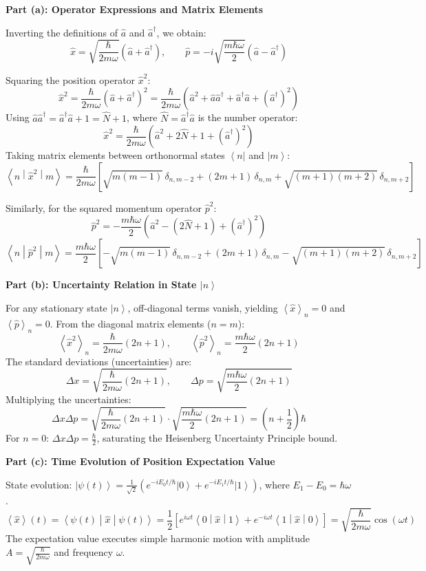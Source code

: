 \documentclass[11pt, a4paper, parskip=half]{scrartcl}
\newcommand{\ket}[1]{\left| #1 \right\rangle}
\newcommand{\bra}[1]{\left\langle #1 \right|}
\newcommand{\mel}[3]{\left\langle #1 \middle| #2 \middle| #3 \right\rangle}
\newcommand{\expval}[1]{\left\langle #1 \right\rangle}
\begin{document}
\begin{solutionbox}
\textbf{Part (a): Operator Expressions and Matrix Elements}

Inverting the definitions of $\hat{a}$ and $\hat{a}^\dagger$, we obtain:
\[
\hat{x} = \sqrt{\frac{\hbar}{2m\omega}} \left( \hat{a} + \hat{a}^\dagger \right), \qquad
\hat{p} = -i \sqrt{\frac{m\hbar\omega}{2}} \left( \hat{a} - \hat{a}^\dagger \right)
\]

Squaring the position operator $\hat{x}^2$:
\[
\hat{x}^2 = \frac{\hbar}{2m\omega} \left( \hat{a} + \hat{a}^\dagger \right)^2 = \frac{\hbar}{2m\omega} \left( \hat{a}^2 + \hat{a}\hat{a}^\dagger + \hat{a}^\dagger\hat{a} + (\hat{a}^\dagger)^2 \right)
\]
Using $\hat{a}\hat{a}^\dagger = \hat{a}^\dagger\hat{a} + 1 = \hat{N} + 1$, where $\hat{N} = \hat{a}^\dagger\hat{a}$ is the number operator:
\[
\hat{x}^2 = \frac{\hbar}{2m\omega} \left( \hat{a}^2 + 2\hat{N} + 1 + (\hat{a}^\dagger)^2 \right)
\]
Taking matrix elements between orthonormal states $\bra{n}$ and $\ket{m}$:
\[
\mel{n}{\hat{x}^2}{m} = \frac{\hbar}{2m\omega} \left[ \sqrt{m(m-1)}\,\delta_{n, m-2} + (2m+1)\,\delta_{n,m} + \sqrt{(m+1)(m+2)}\,\delta_{n, m+2} \right]
\]

Similarly, for the squared momentum operator $\hat{p}^2$:
\[
\hat{p}^2 = -\frac{m\hbar\omega}{2} \left( \hat{a}^2 - (2\hat{N} + 1) + (\hat{a}^\dagger)^2 \right)
\]
\[
\mel{n}{\hat{p}^2}{m} = \frac{m\hbar\omega}{2} \left[ -\sqrt{m(m-1)}\,\delta_{n, m-2} + (2m+1)\,\delta_{n,m} - \sqrt{(m+1)(m+2)}\,\delta_{n, m+2} \right]
\]

\textbf{Part (b): Uncertainty Relation in State $\ket{n}$}

For any stationary state $\ket{n}$, off-diagonal terms vanish, yielding $\expval{\hat{x}}_n = 0$ and $\expval{\hat{p}}_n = 0$.
From the diagonal matrix elements ($n=m$):
\[
\expval{\hat{x}^2}_n = \frac{\hbar}{2m\omega} (2n+1), \qquad \expval{\hat{p}^2}_n = \frac{m\hbar\omega}{2} (2n+1)
\]
The standard deviations (uncertainties) are:
\[
\Delta x = \sqrt{\frac{\hbar}{2m\omega}(2n+1)}, \qquad
\Delta p = \sqrt{\frac{m\hbar\omega}{2}(2n+1)}
\]
Multiplying the uncertainties:
\[
\Delta x \Delta p = \sqrt{\frac{\hbar}{2m\omega}(2n+1)} \cdot \sqrt{\frac{m\hbar\omega}{2}(2n+1)} = \left(n + \frac{1}{2}\right)\hbar
\]
For $n=0$: $\Delta x \Delta p = \frac{\hbar}{2}$, saturating the Heisenberg Uncertainty Principle bound.

\textbf{Part (c): Time Evolution of Position Expectation Value}

State evolution: $\ket{\psi(t)} = \frac{1}{\sqrt{2}} \left( e^{-i E_0 t/\hbar}\ket{0} + e^{-i E_1 t/\hbar}\ket{1} \right)$, where $E_1 - E_0 = \hbar\omega$.
\[
\expval{\hat{x}}(t) = \mel{\psi(t)}{\hat{x}}{\psi(t)} = \frac{1}{2} \left[ e^{i\omega t} \mel{0}{\hat{x}}{1} + e^{-i\omega t} \mel{1}{\hat{x}}{0} \right] = \sqrt{\frac{\hbar}{2m\omega}} \cos(\omega t)
\]
The expectation value executes simple harmonic motion with amplitude $A = \sqrt{\frac{\hbar}{2m\omega}}$ and frequency $\omega$.
\end{solutionbox}
\end{document}
